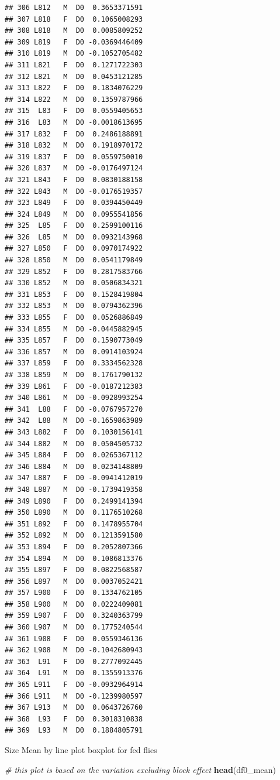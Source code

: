 \documentclass[
]{article}
\newenvironment{Shaded}{\begin{snugshade}}{\end{snugshade}}
\newcommand{\CommentTok}[1]{\textcolor[rgb]{0.56,0.35,0.01}{\textit{#1}}}
\newcommand{\KeywordTok}[1]{\textcolor[rgb]{0.13,0.29,0.53}{\textbf{#1}}}
\newcommand{\NormalTok}[1]{#1}
\begin{document}
\begin{verbatim}
## 306 L812   M  D0  0.3653371591
## 307 L818   F  D0  0.1065008293
## 308 L818   M  D0  0.0085809252
## 309 L819   F  D0 -0.0369446409
## 310 L819   M  D0 -0.1052705482
## 311 L821   F  D0  0.1271722303
## 312 L821   M  D0  0.0453121285
## 313 L822   F  D0  0.1834076229
## 314 L822   M  D0  0.1359787966
## 315  L83   F  D0  0.0559405653
## 316  L83   M  D0 -0.0018613695
## 317 L832   F  D0  0.2486188891
## 318 L832   M  D0  0.1918970172
## 319 L837   F  D0  0.0559750010
## 320 L837   M  D0 -0.0176497124
## 321 L843   F  D0  0.0830188158
## 322 L843   M  D0 -0.0176519357
## 323 L849   F  D0  0.0394450449
## 324 L849   M  D0  0.0955541856
## 325  L85   F  D0  0.2599100116
## 326  L85   M  D0  0.0932143968
## 327 L850   F  D0  0.0970174922
## 328 L850   M  D0  0.0541179849
## 329 L852   F  D0  0.2817583766
## 330 L852   M  D0  0.0506834321
## 331 L853   F  D0  0.1528419804
## 332 L853   M  D0  0.0794362396
## 333 L855   F  D0  0.0526886849
## 334 L855   M  D0 -0.0445882945
## 335 L857   F  D0  0.1590773049
## 336 L857   M  D0  0.0914103924
## 337 L859   F  D0  0.3334562328
## 338 L859   M  D0  0.1761790132
## 339 L861   F  D0 -0.0187212383
## 340 L861   M  D0 -0.0928993254
## 341  L88   F  D0 -0.0767957270
## 342  L88   M  D0 -0.1659863989
## 343 L882   F  D0  0.1030156141
## 344 L882   M  D0  0.0504505732
## 345 L884   F  D0  0.0265367112
## 346 L884   M  D0  0.0234148809
## 347 L887   F  D0 -0.0941412019
## 348 L887   M  D0 -0.1739419358
## 349 L890   F  D0  0.2499141394
## 350 L890   M  D0  0.1176510268
## 351 L892   F  D0  0.1478955704
## 352 L892   M  D0  0.1213591580
## 353 L894   F  D0  0.2052807366
## 354 L894   M  D0  0.1086813376
## 355 L897   F  D0  0.0822568587
## 356 L897   M  D0  0.0037052421
## 357 L900   F  D0  0.1334762105
## 358 L900   M  D0  0.0222409081
## 359 L907   F  D0  0.3240363799
## 360 L907   M  D0  0.1775240544
## 361 L908   F  D0  0.0559346136
## 362 L908   M  D0 -0.1042680943
## 363  L91   F  D0  0.2777092445
## 364  L91   M  D0  0.1355913376
## 365 L911   F  D0 -0.0932964914
## 366 L911   M  D0 -0.1239980597
## 367 L913   M  D0  0.0643726760
## 368  L93   F  D0  0.3018310838
## 369  L93   M  D0  0.1884805791
\end{verbatim}

Size Mean by line plot boxplot for fed flies

\begin{Shaded}
\begin{Highlighting}[]
\CommentTok{# this plot is based on the variation excluding block effect}
\KeywordTok{head}\NormalTok{(df0_mean)}
\end{Highlighting}
\end{Shaded}
\end{document}
